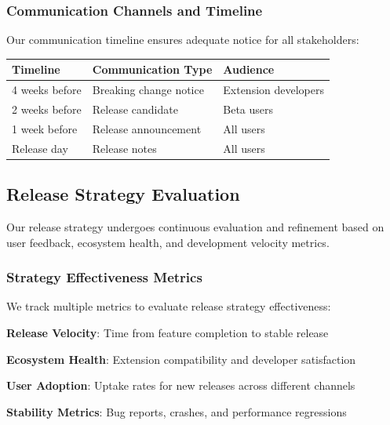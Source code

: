 \subsubsection*{Communication Channels and Timeline}

Our communication timeline ensures adequate notice for all stakeholders:

\begin{center}
\begin{tabular}{@{}lll@{}}
\toprule
\textbf{Timeline} & \textbf{Communication Type} & \textbf{Audience} \\
\midrule
4 weeks before & Breaking change notice & Extension developers \\
2 weeks before & Release candidate & Beta users \\
1 week before & Release announcement & All users \\
Release day & Release notes & All users \\
\bottomrule
\end{tabular}
\end{center}

\subsection*{Release Strategy Evaluation}

Our release strategy undergoes continuous evaluation and refinement based on user feedback, ecosystem health, and development velocity metrics.

\subsubsection*{Strategy Effectiveness Metrics}

We track multiple metrics to evaluate release strategy effectiveness:

\begin{expandedlist}
    \item \textbf{Release Velocity}: Time from feature completion to stable release
    \item \textbf{Ecosystem Health}: Extension compatibility and developer satisfaction
    \item \textbf{User Adoption}: Uptake rates for new releases across different channels
    \item \textbf{Stability Metrics}: Bug reports, crashes, and performance regressions
\end{expandedlist}

